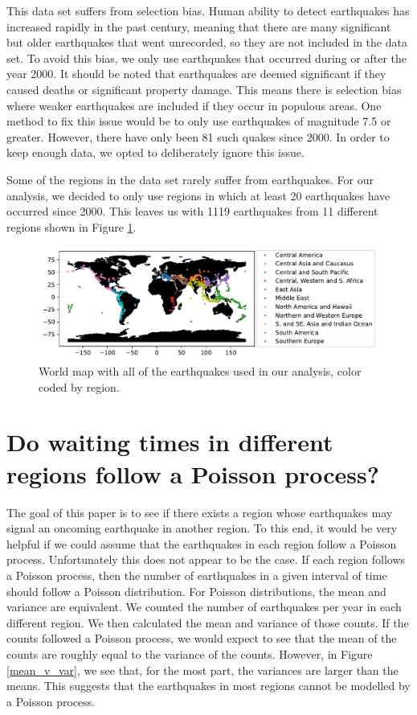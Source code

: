 \documentclass{article}
\begin{document}
This data set suffers from selection bias. Human ability to detect earthquakes has increased rapidly in the past century, meaning that there are many significant but older earthquakes that went unrecorded, so they are not included in the data set. To avoid this bias, we only use earthquakes that occurred during or after the year 2000. It should be noted that earthquakes are deemed significant if they caused deaths or significant property damage. This means there is selection bias where weaker earthquakes are included if they occur in populous areas. One method to fix this issue would be to only use earthquakes of magnitude 7.5 or greater. However, there have only been 81 such quakes since 2000. In order to keep enough data, we opted to deliberately ignore this issue. 

Some of the regions in the data set rarely suffer from earthquakes. For our analysis, we decided to only use regions in which at least 20 earthquakes have occurred since 2000. This leaves us with 1119 earthquakes from 11 different regions shown in Figure \ref{map}.


\begin{figure}[h]
\centering
\includegraphics[scale=0.6]{new_quakes_world_map}
\caption{World map with all of the earthquakes used in our analysis, color coded by region.}
\label{map}
\end{figure}





\section{Do waiting times in different regions follow a Poisson process?}

The goal of this paper is to see if there exists a region whose earthquakes may signal an oncoming earthquake in another region. To this end, it would be very helpful if we could assume that the earthquakes in each region follow a Poisson process. Unfortunately this does not appear to be the case. If each region follows a Poisson process, then the number of earthquakes in a given interval of time should follow a Poisson distribution. For Poisson distributions, the mean and variance are equivalent. We counted the number of earthquakes per year in each different region. We then calculated the mean and variance of those counts. If the counts followed a Poisson process, we would expect to see that the mean of the counts are roughly equal to the variance of the counts. However, in Figure \ref{mean_v_var}, we see that, for the most part, the variances are larger than the means. This suggests that the earthquakes in most regions cannot be modelled by a Poisson process.
\end{document}
